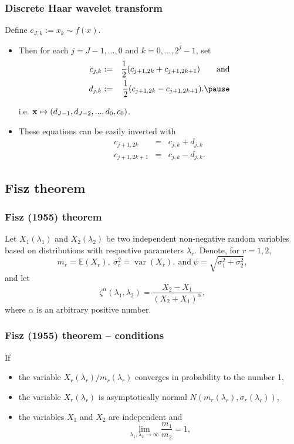 \documentclass{beamer}
\def\E{{\mathbb E}}
\def\la{\lambda}
\newcommand{\Var}{\operatorname{var}}
\def\beq{\begin{equation}}
\def\eeq{\end{equation}}
\def\beqann{\begin{eqnarray*}}
\def\eeqann{\end{eqnarray*}}
\begin{document}
\begin{frame}
\frametitle{Discrete Haar wavelet transform}

Define $c_{J,k}:=x_k \sim f(x) $.\\
\begin{itemize}
\item Then for each $j=J-1,...,0$ and $k=0,...,2^{j}-1$, set  \pause
\beqann c_{j,k}&:=&\frac{1}{2}(c_{j+1,2k}+c_{j+1,2k+1}) \qquad
{\mbox{and}}\\
d_{j,k}&:=&\frac{1}{2}(c_{j+1,2k}-c_{j+1,2k+1}).\pause \eeqann

i.e. ${\bf{x}} \mapsto (d_{J-1},d_{J-2},...,d_{0},c_{0})$.    \pause

\item These equations can be easily inverted with
\beqann c_{j+1,2k}&=&c_{j,k}+d_{j,k}\\
c_{j+1,2k+1}&=&c_{j,k}-d_{j,k}. \eeqann
\end{itemize}
\end{frame}

\subsection{Fisz theorem}
\begin{frame}
\frametitle{Fisz (1955) theorem}

Let $X_{1}(\la_{1})$ and $X_{2}(\la_{2})$ be two independent
non-negative random variables based on distributions with respective
parameters $\la_{r}$. \pause Denote, for $r=1,2$, \beq \nonumber
\label{fisznot} m_{r}=\E (X_{r}), \ \sigma_{r}^{2}=\Var(X_{r}), \
{\mbox{and}}\ \psi=\sqrt{\sigma_{1}^{2}+\sigma_{2}^{2}}, \eeq\pause
 and let \beq \nonumber
\zeta^{\alpha}(\la_{1},\la_{2})=\frac{X_{2}-X_{1}}{(X_{2}+X_{1})^{\alpha}},
\eeq
 where $\alpha$ is an arbitrary positive number.
\end{frame}

\begin{frame}
\frametitle{Fisz (1955) theorem  -- conditions}
If
\begin{itemize}
\item the variable $X_r(\la_r)/m_r(\la_r)$ converges in probability to the number 1,  \pause
\item the variable $X_r(\la_r)$ is asymptotically normal
$N(m_r(\la_r),\sigma_r(\la_r))$,  \pause
\item the variables $X_{1}$ and $X_{2}$ are independent and \beq
\nonumber \lim_{ \la_{1}, \la_{2} \to \infty} \frac{m_{1}}{m_{2}}=1,
\eeq
\end{itemize}

\end{frame}
\end{document}
